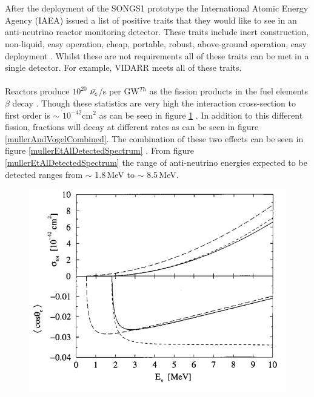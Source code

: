 \\\\After the deployment of the SONGS1 prototype the International Atomic Energy Agency (IAEA) issued a list of positive traits that they would like to see in an anti-neutrino reactor monitoring detector. These traits include inert construction, non-liquid, easy operation, cheap, portable, robust, above-ground operation, easy deployment \cite{IAEA_2008}. Whilst these are not requirements all of these traits can be met in a single detector. For example, VIDARR meets all of these traits. 
\\\\Reactors produce $10^{20}$ $\Bar{\nu_e}$/s per GW$^{Th}$ as the fission products in the fuel elements $\beta$ decay \cite{Mueller_2011}. Though these statistics are very high the interaction cross-section to first order is $\sim$ $10^{-42}$cm$^2$ as can be seen in figure \ref{vogelAndBeacomCrossSection} \cite{Vogel_1999}. In addition to this different fission, fractions will decay at different rates as can be seen in figure \ref{mullerAndVogelCombined}. The combination of these two effects can be seen in figure \ref{mullerEtAlDetectedSpectrum} \cite{Mueller_2011}. From figure \ref{mullerEtAlDetectedSpectrum} the range of anti-neutrino energies expected to be detected ranges from $\sim$ 1.8\,MeV to $\sim$ 8.5\,MeV.
\begin{figure}[htbp]
 \centering
 \includegraphics[width=120mm]{Chapter1/Figs/Raster/vogelAndBeacomCrossSection.png} %
 \label{vogelAndBeacomCrossSection}
\end{figure}
